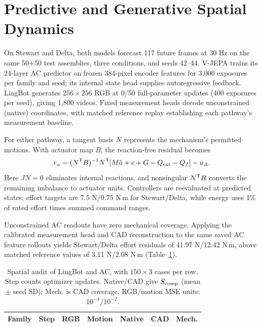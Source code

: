 \documentclass[10pt,twocolumn,letterpaper]{article}
\begin{document}
\section{Predictive and Generative Spatial Dynamics}
\label{sec:spatial}
On Stewart and Delta, both models forecast 117 future frames at 30 Hz on the same 50+50 test assemblies, three conditions, and seeds 42--44. V-JEPA trains its 24-layer AC predictor on frozen 384-pixel encoder features for 3,000 exposures per family and seed; its internal state head supplies autoregressive feedback. LingBot generates $256\times256$ RGB at 0/50 full-parameter updates (400 exposures per seed), giving 1,800 videos. Fixed measurement heads decode unconstrained (native) coordinates, with matched reference replay establishing each pathway's measurement baseline.

For either pathway, a tangent basis $N$ represents the mechanism's permitted motions. With actuator map $B$, the reaction-free residual becomes
\begin{equation}
r_u=(N^{\mathsf T} B)^{-1}N^{\mathsf T}[M\hat a+c+G-Q_{\rm ext}-Q_f]-u_A.
\label{eq:spatial-effort}
\end{equation}
Here $JN=0$ eliminates internal reactions, and nonsingular $N^{\mathsf T} B$ converts the remaining imbalance to actuator units. Controllers are reevaluated at predicted states; effort targets are 7.5 N/0.75 N\,m for Stewart/Delta, while energy uses 1\% of rated effort times summed command ranges.

Unconstrained AC readouts have zero mechanical coverage. Applying the calibrated measurement head and CAD reconstruction to the same saved AC feature rollouts yields Stewart/Delta effort residuals of 41.97 N/12.42 N\,m, above matched reference values of 3.11 N/2.08 N\,m (Table~\ref{tab:spatial}).

\begingroup
\setlength{\intextsep}{5pt}
\begin{table}[H]
\caption{Spatial audit of LingBot and AC, with $150\times3$ cases per row. Step counts optimizer updates. Native/CAD give $S_{\rm comp}$ (mean $\pm$ seed SD); Mech. is CAD coverage. RGB/motion MSE units: $10^{-4}/10^{-2}$.}
\label{tab:spatial}
\centering\footnotesize
\setlength{\tabcolsep}{2.0pt}
\begin{tabular}{@{}lrrrrrr@{}}
\toprule
Family & Step & RGB & Motion & Native & CAD & Mech.\\
\midrule

\midrule

\bottomrule
\end{tabular}
\end{table}
\endgroup
\end{document}
